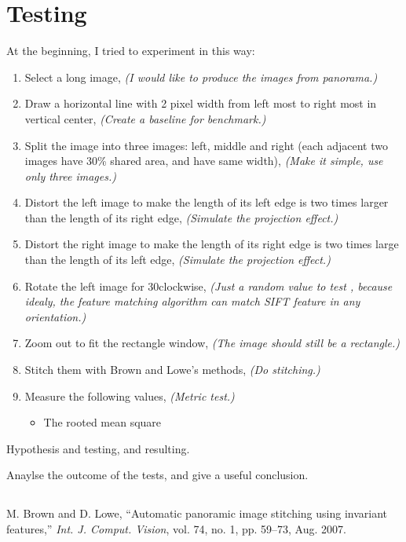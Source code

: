 \documentclass[10pt,twocolumn,letterpaper]{article}
\begin{document}


\section{Testing}
At the beginning, I tried to experiment in this way:
\begin{enumerate}
    \item Select a long image, \textit{(I would like to produce the images from panorama.)}
    \item Draw a horizontal line with 2 pixel width from left most to right most in vertical center, \textit{(Create a baseline for benchmark.)}
    \item Split the image into three images: left, middle and right (each adjacent two images have 30\% shared area, and have same width), \textit{(Make it simple, use only three images.)}
    \item Distort the left image to make the length of its left edge is two times larger than the length of its right edge, \textit{(Simulate the projection effect.)}
    \item Distort the right image to make the length of its right edge is two times large than the length of its left edge, \textit{(Simulate the projection effect.)}
    \item Rotate the left image for 30\degree clockwise, \textit{(Just a random value to test , because idealy, the feature matching algorithm can match SIFT feature in any orientation.)}
    \item Zoom out to fit the rectangle window, \textit{(The image should still be a rectangle.)}
    \item Stitch them with Brown and Lowe's methods, \textit{(Do stitching.)}
    \item Measure the following values, \textit{(Metric test.)} 
    \begin{itemize}
        \item The rooted mean square 
    \end{itemize}
\end{enumerate}


Hypothesis and testing, and resulting.

Anaylse the outcome of the tests, and give a useful conclusion.

\subsection{}


\begin{thebibliography}{9}
M. Brown and D. Lowe, ``Automatic panoramic image stitching using invariant features,''
\textit{Int. J. Comput. Vision}, vol. 74, no. 1, pp. 59–73, Aug. 2007.

\end{thebibliography}
\end{document}
